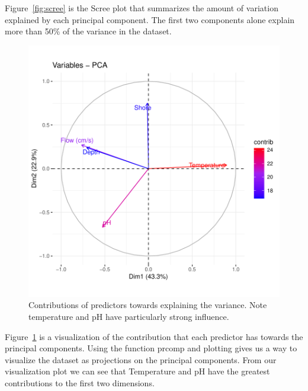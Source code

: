 Figure~\ref{fig:scree} is the Scree plot that summarizes the amount of variation explained by each principal component. The first two components alone explain more than 50\% of the variance in the dataset.

\begin{figure}[H]
\includegraphics{Chapter5Images/pcaContrib.pdf}
\caption{Contributions of predictors towards explaining the variance. Note temperature and pH have particularly strong influence.}
\label{fig:pcacontrib}
\end{figure}

Figure~\ref{fig:pcacontrib} is a visualization of the contribution that each predictor has towards the principal components. Using the function prcomp and plotting gives us a way to visualize the dataset as projections on the principal components. From our visualization plot we can see that Temperature and pH have the greatest contributions to the first two dimensions.

